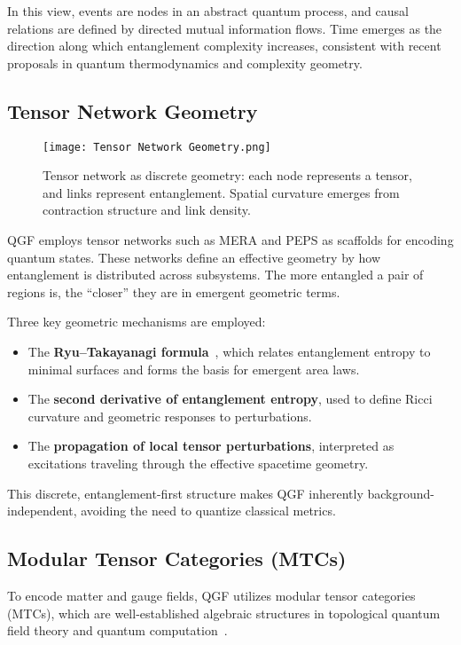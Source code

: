 \documentclass[11pt]{article}
\begin{document}
In this view, events are nodes in an abstract quantum process, and causal relations are defined by directed mutual information flows. Time emerges as the direction along which entanglement complexity increases, consistent with recent proposals in quantum thermodynamics and complexity geometry.

\subsection{Tensor Network Geometry}

\begin{figure}[h!]
\centering
\texttt{[image: Tensor Network Geometry.png]}
\caption{Tensor network as discrete geometry: each node represents a tensor, and links represent entanglement. Spatial curvature emerges from contraction structure and link density.}
\label{fig:network_geometry}
\end{figure}

QGF employs tensor networks such as MERA and PEPS as scaffolds for encoding quantum states. These networks define an effective geometry by how entanglement is distributed across subsystems. The more entangled a pair of regions is, the “closer” they are in emergent geometric terms.

Three key geometric mechanisms are employed:
\begin{itemize}
    \item The \textbf{Ryu--Takayanagi formula}~\cite{ryu2006holographic}, which relates entanglement entropy to minimal surfaces and forms the basis for emergent area laws.
    \item The \textbf{second derivative of entanglement entropy}, used to define Ricci curvature and geometric responses to perturbations.
    \item The \textbf{propagation of local tensor perturbations}, interpreted as excitations traveling through the effective spacetime geometry.
\end{itemize}

This discrete, entanglement-first structure makes QGF inherently background-independent, avoiding the need to quantize classical metrics.

\subsection{Modular Tensor Categories (MTCs)}

To encode matter and gauge fields, QGF utilizes modular tensor categories (MTCs), which are well-established algebraic structures in topological quantum field theory and quantum computation~\cite{kitaev2006anyons,levin2005string,kong2014anyon}.
\end{document}
